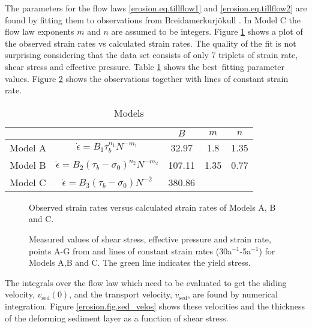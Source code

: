 The parameters for the flow laws \eqref{erosion.eq.tillflow1} and \eqref{erosion.eq.tillflow2} are found by fitting them to observations from Breidamerkurj\"okull \citep{Boulton1987}. In Model C the flow law exponents $m$ and $n$ are assumed to be integers. Figure \ref{erosion.fig.stress-strain-fit} shows a plot of the observed strain rates vs calculated strain rates. The quality of the fit is not surprising considering that the data set consists of only 7 triplets of strain rate, shear stress and effective pressure. Table \ref{erosion.tab.models} shows the best--fitting parameter values. Figure \ref{erosion.fig.stress-strain} shows the observations together with lines of constant strain rate.

\begin{table}[htbp]
  \centering
  \begin{tabular}{|c|c|ccc|}
    \hline
    \multicolumn{2}{c|}{} & $B$ & $m$ & $n$ \\
    \hline
    Model A& $\dot\epsilon=B_1{\tau_b^{n_1}}{N^{-m_1}}$            & 32.97  & 1.8 & 1.35 \\
    Model B& $\dot\epsilon=B_2{(\tau_b-\sigma_0)^{n_2}}{N^{-m_2}}$ & 107.11 & 1.35 & 0.77 \\
    Model C& $\dot\epsilon=B_3{(\tau_b-\sigma_0)}{N^{-2}}$         & 380.86 & \multicolumn{2}{c|}{}\\
    \hline
  \end{tabular}
  \caption{Models}
  \label{erosion.tab.models}
\end{table}


\begin{figure}[htbp]
  \centering
  
  \caption{Observed strain rates versus calculated strain rates of Models A, B and C.}
  \label{erosion.fig.stress-strain-fit}
\end{figure}

\begin{figure}[htbp]
  \centering
  
  \caption{Measured values of shear stress, effective pressure and strain rate, points A-G from \citet{Boulton1987} and lines of constant strain rates (30a$^{-1}$-5a$^{-1}$) for Models A,B and C. The green line indicates the yield stress.}
  \label{erosion.fig.stress-strain}
\end{figure}

The integrals over the flow law which need to be evaluated to get the sliding velocity, $v_{\text{sed}}(0)$, and the transport velocity, $\overline{v}_{\text{sed}}$, are found by numerical integration. Figure \ref{erosion.fig.sed_velos} shows these velocities and the thickness of the deforming sediment layer as a function of shear stress.




